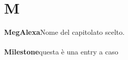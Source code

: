 \newpage
\section{M}\label{l:M}
\textbf{MegAlexa}\newline Nome del capitolato scelto.\\\\

\textbf{Milestone}\newline questa è una entry a caso